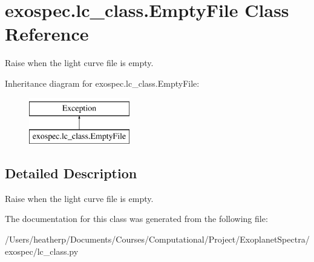 \hypertarget{classexospec_1_1lc__class_1_1_empty_file}{}\section{exospec.\+lc\+\_\+class.\+Empty\+File Class Reference}
\label{classexospec_1_1lc__class_1_1_empty_file}


Raise when the light curve file is empty.  


Inheritance diagram for exospec.\+lc\+\_\+class.\+Empty\+File\+:\begin{figure}[H]
\begin{center}
\leavevmode
\includegraphics[height=2.000000cm]{classexospec_1_1lc__class_1_1_empty_file}
\end{center}
\end{figure}


\subsection{Detailed Description}
Raise when the light curve file is empty. 

The documentation for this class was generated from the following file\+:\begin{DoxyCompactItemize}
\item 
/\+Users/heatherp/\+Documents/\+Courses/\+Computational/\+Project/\+Exoplanet\+Spectra/exospec/lc\+\_\+class.\+py\end{DoxyCompactItemize}
